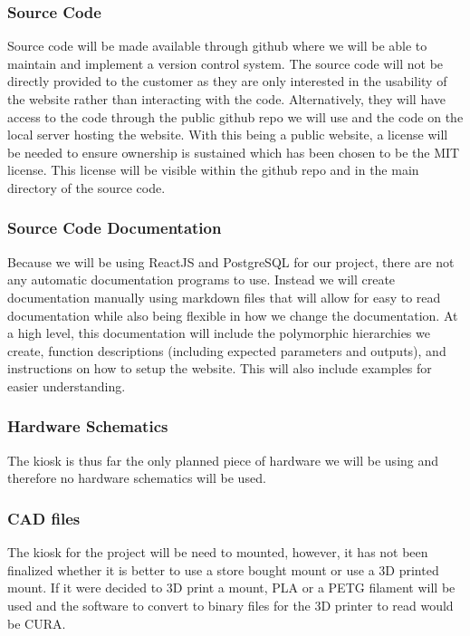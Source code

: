 \subsubsection{Source Code}
Source code will be made available through github where we will be able to maintain and implement a version control system. The source code will not be directly provided to the customer as they are only interested in the usability of the website rather than interacting with the code. Alternatively, they will have access to the code through the public github repo we will use and the code on the local server hosting the website. With this being a public website, a license will be needed to ensure ownership is sustained which has been chosen to be the MIT license. This license will be visible within the github repo and in the main directory of the source code.

\subsubsection{Source Code Documentation}
Because we will be using ReactJS and PostgreSQL for our project, there are not any automatic documentation programs to use. Instead we will create documentation manually using markdown files that will allow for easy to read documentation while also being flexible in how we change the documentation. At a high level, this documentation will include the polymorphic hierarchies we create, function descriptions (including expected parameters and outputs), and instructions on how to setup the website. This will also include examples for easier understanding.

\subsubsection{Hardware Schematics}
The kiosk is thus far the only planned piece of hardware we will be using and therefore no hardware schematics will be used. 

\subsubsection{CAD files}
The kiosk for the project will be need to mounted, however, it has not been finalized whether it is better to use a store bought mount or use a 3D printed mount. If it were decided to 3D print a mount, PLA or a PETG filament will be used and the software to convert to binary files for the 3D printer to read would be CURA. 

